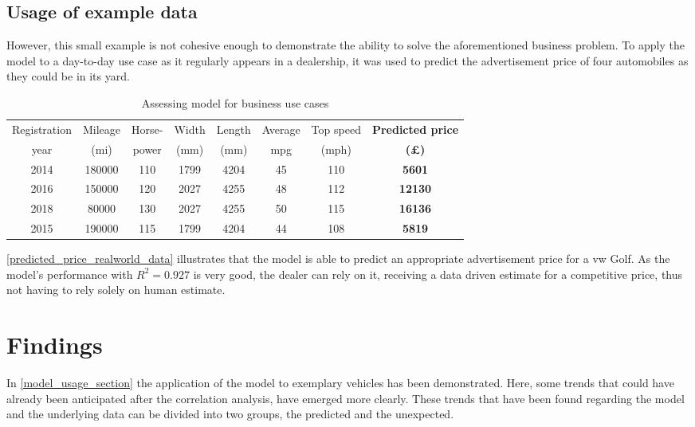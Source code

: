 \subsection{Usage of example data}
However, this small example is not cohesive enough to demonstrate the ability to solve the aforementioned business problem.
To apply the model to a day-to-day use case as it regularly appears in a dealership, it was used to predict the advertisement price
of four automobiles as they could be in its yard.
\begin{table}[H]
    \begin{adjustbox}{width={\textwidth}}
        \begin{tabular}{|c|c|c|c|c|c|c|c|}
            \hline
            Registration & Mileage & Horse- & Width & Length & Average & Top speed & \textbf{Predicted price} \\[-1ex]
            year         & (mi)    & power  & (mm)  & (mm)   & mpg     & (mph)     & \textbf{(£)}             \\ \hline
            2014         & 180000  & 110    & 1799  & 4204   & 45      & 110       & \textbf{5601}            \\\hline
            2016         & 150000  & 120    & 2027  & 4255   & 48      & 112       & \textbf{12130}           \\\hline
            2018         & 80000   & 130    & 2027  & 4255   & 50      & 115       & \textbf{16136}           \\\hline
            2015         & 190000  & 115    & 1799  & 4204   & 44      & 108       & \textbf{5819}            \\ \hline
        \end{tabular}
    \end{adjustbox}
    \caption{Assessing model for business use cases}
    \label{predicted_price_realworld_data}
\end{table}
\autoref{predicted_price_realworld_data} illustrates that the model is able to predict an appropriate advertisement price
for a \ac{vw} Golf. As the model's performance with $R^2 = 0.927$ is very good, the dealer can rely on it, receiving a data driven
estimate for a competitive price, thus not having to rely solely on human estimate. 
\section{Findings}
In \autoref{model_usage_section} the application of the model to exemplary vehicles has been demonstrated. %
Here, some trends that could have already been anticipated after the correlation analysis, have emerged more clearly.  
\newline
These trends that have been found regarding the model and the underlying data can be divided into two groups, the predicted and the unexpected.
